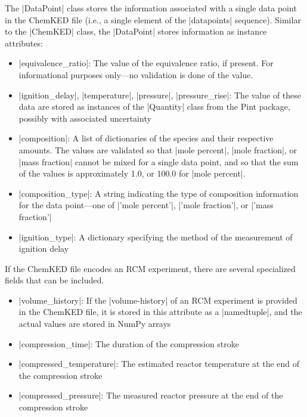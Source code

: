 \documentclass[12pt]{ijck}
\newcommand\ck{ChemKED}
\begin{document}
The \pybox|DataPoint| class stores the information associated with a single data
point in the \ck{} file (i.e., a single element of the \yabox|datapoints|
sequence). Similar to the \pybox|ChemKED| class,
the \pybox|DataPoint| stores information as instance attributes:
%
\begin{itemize}
    \item \pybox|equivalence_ratio|: The value of the equivalence ratio, if
    present. For informational purposes only---no validation is done of the
    value.
    \item \pybox|ignition_delay|, \pybox|temperature|, \pybox|pressure|,
    \pybox|pressure_rise|: The value of these data are stored as instances of
    the \pybox|Quantity| class from the Pint \autocite{Grecco2016} package,
    possibly with associated uncertainty
    \item \pybox|composition|: A list of dictionaries of the species and their
    respective amounts. The values are validated so that \yabox|mole percent|,
    \yabox|mole fraction|, or \yabox|mass fraction| cannot be mixed for a single
    data point, and so that the sum of the values is approximately 1.0, or
    100.0 for \yabox|mole percent|.
    \item \pybox|composition_type|: A string indicating the type of composition
    information for the data point---one of \pybox|'mole percent'|,
    \pybox|'mole fraction'|, or \pybox|'mass fraction'|
    \item \pybox|ignition_type|: A dictionary specifying the method of the
    measurement of ignition delay
\end{itemize}

If the \ck{} file encodes an RCM experiment, there are several specialized fields that can be
included.

\begin{itemize}
    \item \pybox|volume_history|: If the \yabox|volume-history| of an RCM
    experiment is provided in the \ck{} file, it is stored in this attribute as
    a \pybox|namedtuple|, and the actual values are stored in NumPy arrays
    \autocite{vanderWalt:2011np}
    \item \pybox|compression_time|: The duration of the compression stroke
    \item \pybox|compressed_temperature|: The estimated reactor temperature at the end of the
    compression stroke
    \item \pybox|compressed_pressure|: The measured reactor pressure at the end of the compression
    stroke
\end{itemize}
\end{document}

